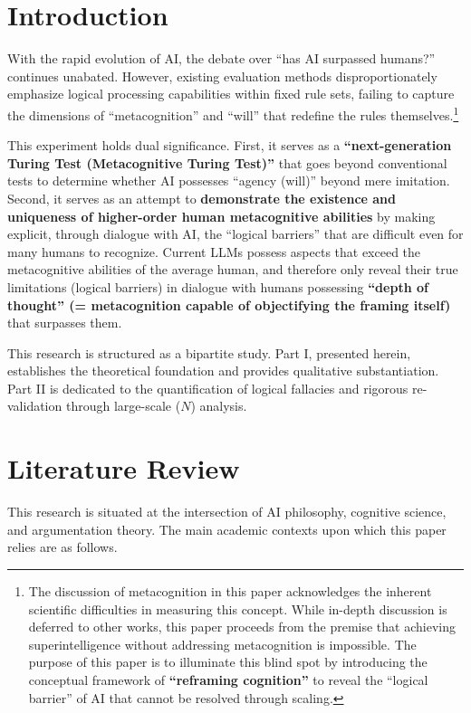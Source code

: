 \documentclass[11pt, a4paper]{article}
\begin{document}
\section{Introduction}
With the rapid evolution of AI, the debate over ``has AI surpassed humans?'' continues unabated. However, existing evaluation methods disproportionately emphasize logical processing capabilities within fixed rule sets, failing to capture the dimensions of ``metacognition'' and ``will'' that redefine the rules themselves.\footnote{The discussion of metacognition in this paper acknowledges the inherent scientific difficulties in measuring this concept. While in-depth discussion is deferred to other works, this paper proceeds from the premise that achieving superintelligence without addressing metacognition is impossible. The purpose of this paper is to illuminate this blind spot by introducing the conceptual framework of \textbf{``reframing cognition''} to reveal the ``logical barrier'' of AI that cannot be resolved through scaling.}

This experiment holds dual significance. First, it serves as a \textbf{``next-generation Turing Test (Metacognitive Turing Test)''} that goes beyond conventional tests to determine whether AI possesses ``agency (will)'' beyond mere imitation. Second, it serves as an attempt to \textbf{demonstrate the existence and uniqueness of higher-order human metacognitive abilities} by making explicit, through dialogue with AI, the ``logical barriers'' that are difficult even for many humans to recognize. Current LLMs possess aspects that exceed the metacognitive abilities of the average human, and therefore only reveal their true limitations (logical barriers) in dialogue with humans possessing \textbf{``depth of thought'' (= metacognition capable of objectifying the framing itself)} that surpasses them.

This research is structured as a bipartite study. Part I, presented herein, establishes the theoretical foundation and provides qualitative substantiation. Part II is dedicated to the quantification of logical fallacies and rigorous re-validation through large-scale ($N$) analysis.

\section{Literature Review}
This research is situated at the intersection of AI philosophy, cognitive science, and argumentation theory. The main academic contexts upon which this paper relies are as follows.
\end{document}
